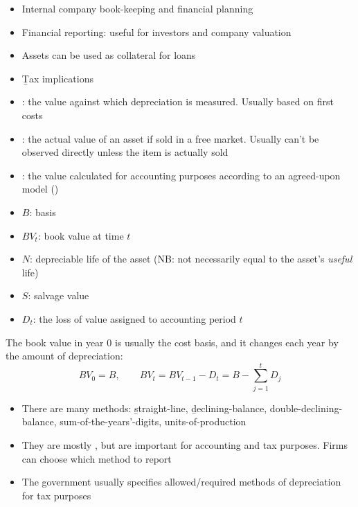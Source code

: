 \begin{itemize}
    \item Internal company book-keeping and financial planning
    \item Financial reporting: useful for investors and company valuation
    \item Assets can be used as collateral for loans
    \item \b{Tax implications}
\end{itemize}

\begin{itemize}
    \item {}: the value against which depreciation is measured. Usually based on first costs
    \item {}: the actual value of an asset if sold in a free market. Usually can't be observed directly unless the item is actually sold
    \item {}: the value calculated for accounting purposes according to an agreed-upon model ()
\end{itemize}

\begin{itemize}
    \item $B$: basis
    \item $BV_t$: book value at time $t$
    \item $N$: depreciable life of the asset (NB: not necessarily equal to the asset's \emph{useful} life)
    \item $S$: salvage value
    \item $D_t$: the loss of value assigned to accounting period $t$
\end{itemize}
The book value in year 0 is usually the cost basis, and it changes each year
by the amount of depreciation:
\[\boxed{BV_0 = B, \qquad BV_t = BV_{t-1} - D_t = B - \sum_{j=1}^{t} D_j}\]

\begin{itemize}
    \item There are many methods: \b{straight-line}, \b{declining-balance}, double-declining-balance, sum-of-the-years'-digits, units-of-production
    \item They are mostly , but are important for accounting and tax purposes. Firms can choose which method to report
    \item The government usually specifies allowed/required methods of depreciation for tax purposes
\end{itemize}

